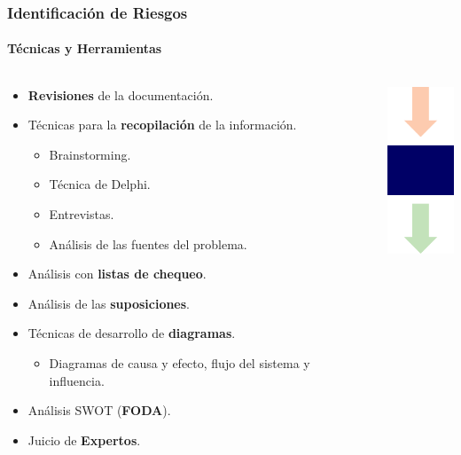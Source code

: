 \begin{frame}
\frametitle{Identificación de Riesgos}
\framesubtitle{Técnicas y Herramientas}

\begin{columns}
	\begin{column}{0.8\textwidth}
\begin{itemize}
    \item<1-> \textbf{Revisiones} de la documentación.
    \item<2-> Técnicas para la \textbf{recopilación} de la información.
    \begin{itemize}
        \item Brainstorming.
        \item Técnica de Delphi.
        \item Entrevistas.
        \item Análisis de las fuentes del problema.
    \end{itemize}
    \item<3-> Análisis con \textbf{listas de chequeo}.
    \item<4-> Análisis de las \textbf{suposiciones}.
    \item<5-> Técnicas de desarrollo de \textbf{diagramas}.
    \begin{itemize}
        \item Diagramas de causa y efecto, flujo del sistema y influencia.
    \end{itemize}
    \item<6-> Análisis SWOT (\textbf{FODA}).
    \item<7-> Juicio de \textbf{Expertos}.
\end{itemize}
	\end{column}
	\begin{column}{0.2\textwidth}
		\includegraphics[width=2cm]{img/tools}
	\end{column}
\end{columns}
\end{frame}

